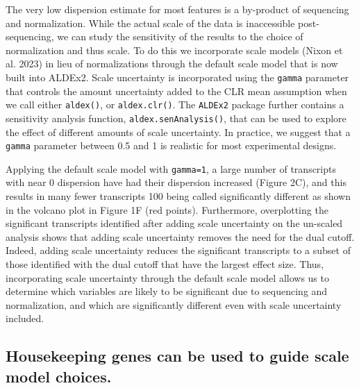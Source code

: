 \documentclass[
]{article}
\begin{document}
The very low dispersion estimate for most features is a by-product of
sequencing and normalization. While the actual scale of the data is
inaccessible post-sequencing, we can study the sensitivity of the
results to the choice of normalization and thus scale. To do this we
incorporate scale models (Nixon et al. 2023) in lieu of normalizations
through the default scale model that is now built into ALDEx2. Scale
uncertainty is incorporated using the \texttt{gamma} parameter that
controls the amount uncertainty added to the CLR mean assumption when we
call either \texttt{aldex()}, or \texttt{aldex.clr()}. The
\texttt{ALDEx2} package further contains a sensitivity analysis
function, \texttt{aldex.senAnalysis()}, that can be used to explore the
effect of different amounts of scale uncertainty. In practice, we
suggest that a \texttt{gamma} parameter between 0.5 and 1 is realistic
for most experimental designs.

Applying the default scale model with \texttt{gamma=1}, a large number
of transcripts with near 0 dispersion have had their dispersion
increased (Figure 2C), and this results in many fewer transcripts 100
being called significantly different as shown in the volcano plot in
Figure 1F (red points). Furthermore, overplotting the significant
transcripts identified after adding scale uncertainty on the un-scaled
analysis shows that adding scale uncertainty removes the need for the
dual cutoff. Indeed, adding scale uncertainty reduces the significant
transcripts to a subset of those identified with the dual cutoff that
have the largest effect size. Thus, incorporating scale uncertainty
through the default scale model allows us to determine which variables
are likely to be significant due to sequencing and normalization, and
which are significantly different even with scale uncertainty included.

\hypertarget{housekeeping-genes-can-be-used-to-guide-scale-model-choices.}{%
\subsection{Housekeeping genes can be used to guide scale model
choices.}\label{housekeeping-genes-can-be-used-to-guide-scale-model-choices.}}
\end{document}
